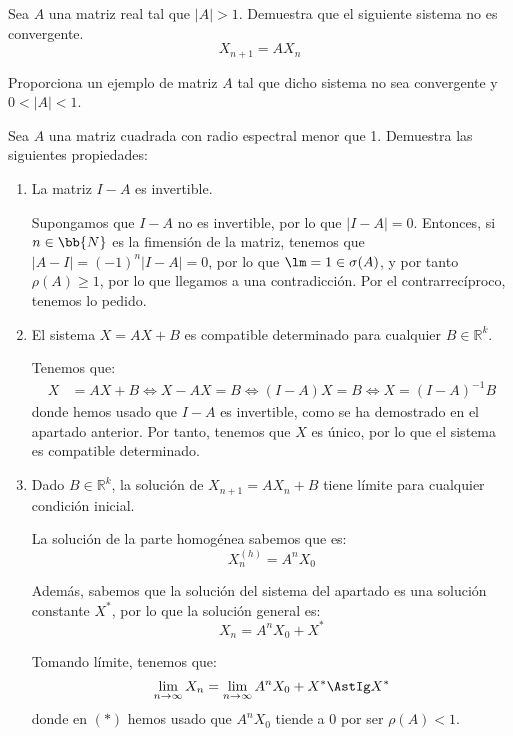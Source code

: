 \begin{ejercicio}
    Sea $A$ una matriz real tal que $|A| > 1$. Demuestra que el siguiente sistema no es convergente.
    \begin{equation*}
    X_{n+1} = AX_n
    \end{equation*}
    
    Proporciona un ejemplo de matriz $A$ tal que dicho sistema no sea convergente y $0 < |A| < 1$.

\end{ejercicio}

\begin{ejercicio}
Sea $A$ una matriz cuadrada con radio espectral menor que 1. Demuestra las siguientes propiedades:

\begin{enumerate}
    \item La matriz $I - A$ es invertible.
    
    Supongamos que $I-A$ no es invertible, por lo que $|I-A|=0$.
    Entonces, si $n\in \bb{N}$ es la fimensión de la matriz, tenemos que $|A-I|=(-1)^n|I-A| = 0$,
    por lo que $\lm=1\in \sigma(A)$, y por tanto $\rho(A)\geq 1$, por lo que llegamos a una contradicción.
    Por el contrarrecíproco, tenemos lo pedido.
    \item El sistema $X = AX + B$ es compatible determinado para cualquier $B \in \mathbb{R}^k$.
    
    Tenemos que:
    \begin{align*}
        X &= AX + B \Longleftrightarrow
        X - AX = B \Longleftrightarrow
        (I - A)X = B \Longleftrightarrow
        X = (I - A)^{-1}B
    \end{align*}
    donde hemos usado que $I - A$ es invertible, como se ha demostrado en el apartado anterior.
    Por tanto, tenemos que $X$ es único, por lo que el sistema es compatible determinado.

    \item Dado $B \in \mathbb{R}^k$, la solución de $X_{n+1} = AX_n + B$ tiene límite para cualquier condición inicial.
    
    La solución de la parte homogénea sabemos que es:
    \begin{equation*}
        X_n^{(h)} = A^nX_0
    \end{equation*}

    Además, sabemos que la solución del sistema del apartado es una solución constante $X^\ast$,
    por lo que la solución general es:
    \begin{equation*}
        X_n = A^nX_0 + X^\ast
    \end{equation*}

    Tomando límite, tenemos que:
    \begin{equation*}
        \lim_{n\to\infty}X_n = \lim_{n\to\infty}A^nX_0 + X^\ast
        \AstIg X^\ast
    \end{equation*}
    donde en $(\ast)$ hemos usado que $A^nX_0$ tiende a 0 por ser $\rho(A) < 1$.
\end{enumerate}
\end{ejercicio}

